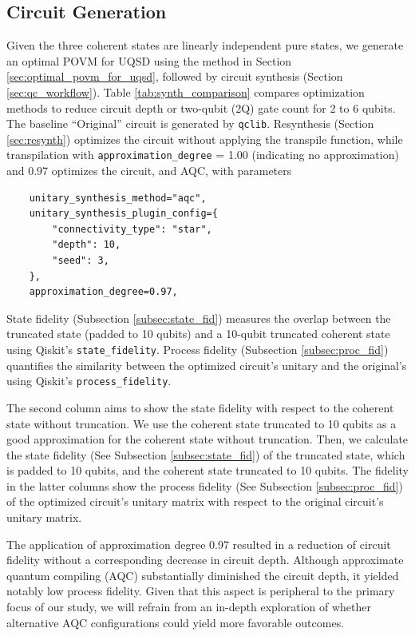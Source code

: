\subsection{Circuit Generation}
Given the three coherent states are linearly independent pure states, we
generate an optimal POVM for UQSD using the method in Section \ref{sec:optimal_povm_for_uqsd},
followed by circuit synthesis (Section \ref{sec:qc_workflow}).
Table \ref{tab:synth_comparison} compares optimization methods to reduce
circuit depth or two-qubit (2Q) gate count for 2 to 6 qubits.
The baseline “Original” circuit is generated by \texttt{qclib}.
Resynthesis (Section \ref{sec:resynth}) optimizes the circuit without applying
the transpile function, while transpilation with
\texttt{approximation\_degree} = 1.00 (indicating no approximation) and 0.97
optimizes the circuit, and AQC, with parameters
\begin{verbatim}
    unitary_synthesis_method="aqc",
    unitary_synthesis_plugin_config={
        "connectivity_type": "star",
        "depth": 10,
        "seed": 3,
    },
    approximation_degree=0.97,
\end{verbatim}
State fidelity (Subsection \ref{subsec:state_fid}) measures the overlap
between the truncated state (padded to 10 qubits) and a 10-qubit truncated
coherent state using Qiskit’s \texttt{state\_fidelity}.
Process fidelity (Subsection \ref{subsec:proc_fid}) quantifies the similarity
between the optimized circuit’s unitary and the original’s using Qiskit’s \texttt{process\_fidelity}.



The second column aims to show the state fidelity with respect to the coherent
state without truncation. We use the coherent state truncated to 10 qubits as
a good approximation for the coherent state without truncation.
Then, we calculate the state fidelity (See Subsection
\ref{subsec:state_fid}) of the truncated state, which is padded to 10 qubits,
and the coherent state truncated to 10 qubits.
The fidelity in the latter columns show the process fidelity
(See Subsection \ref{subsec:proc_fid}) of the optimized circuit's unitary
matrix with respect to the original circuit's unitary matrix.

The application of approximation degree 0.97 resulted in a reduction of
circuit fidelity without a corresponding decrease in circuit depth.
Although approximate quantum compiling (AQC) substantially diminished the
circuit depth, it yielded notably low process fidelity.
Given that this aspect is peripheral to the primary focus of our study, we
will refrain from an in-depth exploration of whether alternative AQC
configurations could yield more favorable outcomes.

